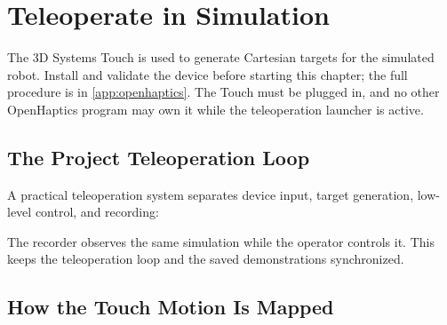 \chapter{Teleoperate in Simulation}
\label{chap:touch}

The 3D Systems Touch is used to generate Cartesian targets for the simulated
robot. Install and validate the device before starting this chapter; the full
procedure is in \cref{app:openhaptics}. The Touch must be plugged in, and no
other OpenHaptics program may own it while the teleoperation launcher is active.

\section{The Project Teleoperation Loop}

A practical teleoperation system separates device input, target generation,
low-level control, and recording:

\begin{center}
\end{center}

The recorder observes the same simulation while the operator controls it. This
keeps the teleoperation loop and the saved demonstrations synchronized.

\section{How the Touch Motion Is Mapped}


